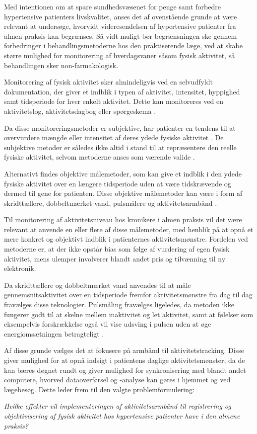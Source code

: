 Med intentionen om at spare sundhedsvæsenet for penge samt forbedre hypertensive patienters livskvalitet, anses det af ovenstående grunde at være relevant at undersøge, hvorvidt videresendelsen af hypertensive patienter fra almen praksis kan begrænses. Så vidt muligt bør begrænsningen ske gennem forbedringer i behandlingsmetoderne hos den praktiserende læge, ved at skabe større mulighed for monitorering af hverdagsvaner såsom fysisk aktivitet, så behandlingen sker non-farmakologisk.

Monitorering af fysisk aktivitet sker almindeligvis ved en selvudfyldt dokumentation, der giver et indblik i typen af aktivitet, intensitet, hyppighed samt tidsperiode for hver enkelt aktivitet. Dette kan monitoreres ved en aktivitetslog, aktivitetsdagbog eller spørgeskema \citep{adamo2009}. 

Da disse monitoreringsmetoder er subjektive, har patienter en tendens til at overvurdere mængde eller intensitet af deres ydede fysiske aktivitet \citep{adamo2009}. De subjektive metoder er således ikke altid i stand til at repræsentere den reelle fysiske aktivitet, selvom metoderne anses som værende valide \citep{motionsraad2007, pedersen2011}. 

Alternativt findes objektive målemetoder, som kan give et indblik i den ydede fysiske aktivitet over en længere tidsperiode uden at være tidskrævende og dermed til gene for patienten. Disse objektive målemetoder kan være i form af skridttællere, dobbeltmærket vand, pulsmålere og aktivitetsarmbånd \citep{motionsraad2007}.

Til monitorering af aktivitetsniveau hos kronikere i almen praksis vil det være relevant at anvende en eller flere af disse målemetoder, med henblik på at opnå et mere konkret og objektivt indblik i patienternes aktivitetsmønstre. Fordelen ved metoderne er, at der ikke opstår bias som følge af vurdering af egen fysisk aktivitet, mens ulemper involverer blandt andet pris og tilvænning til ny elektronik. 

Da skridttællere og dobbeltmærket vand anvendes til at måle gennemsnitsaktivitet over en tidsperiode fremfor aktivitetsmønstre fra dag til dag fravælges disse teknologier. 
Pulsmåling fravælges ligeledes, da metoden ikke fungerer godt til at skelne mellem inaktivitet og let aktivitet, samt at følelser som eksempelvis forskrækkelse også vil vise udsving i pulsen uden at øge energiomsætningen betragteligt \citep{motionsraad2007}. 

Af disse grunde vælges det at fokusere på armbånd til aktivitetstracking. Disse giver  mulighed for at opnå indsigt i patientens daglige aktivitetsmønster, da de kan bæres døgnet rundt og giver mulighed for synkronisering med blandt andet computere, hvorved dataoverførsel og -analyse kan gøres i hjemmet og ved lægebesøg. Dette leder frem til den valgte problemformulering: 

\begin{center}
\textit{Hvilke effekter vil implementeringen af aktivitetsarmbånd til registrering og objektivisering af fysisk aktivitet hos hypertensive patienter have i den almene praksis?}
\end{center}